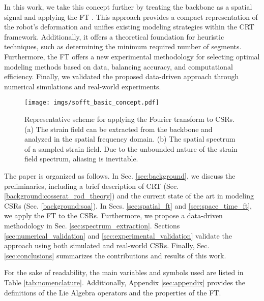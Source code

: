 In this work, we take this concept further by treating the backbone as a spatial signal and applying the \ac{FT} \cite{bracewell2007fourier}. This approach provides a compact representation of the robot's deformation and unifies existing modeling strategies within the \ac{CRT} framework. 
Additionally, it offers a theoretical foundation for heuristic techniques, such as determining the minimum required number of segments.
Furthermore, the \ac{FT} offers a new experimental methodology for selecting optimal modeling methods based on data, balancing accuracy, and computational efficiency.
Finally, we validated the proposed data-driven approach through numerical simulations and real-world experiments.
%     
\begin{figure}
    \centering
    \texttt{[image: imgs/sofft\_basic\_concept.pdf]}
    \caption{Representative scheme for applying the Fourier transform to \acp{CSR}. (a) The strain field can be extracted from the backbone and analyzed in the spatial frequency domain. (b) The spatial spectrum of a sampled strain field. Due to the unbounded nature of the strain field spectrum, aliasing is inevitable.}
    \label{fig:concept}
\end{figure}


The paper is organized as follows. In Sec. \ref{sec:background}, we discuss the preliminaries, including a brief description of \ac{CRT} (Sec. \ref{background:cosserat_rod_theory}) and the current state of the art in modeling \acp{CSR} (Sec. \ref{background:soa}). In Secs. \ref{sec:spatial_ft} and \ref{sec:space_time_ft}, we apply the \ac{FT} to the \acp{CSR}. Furthermore, we propose a data-driven methodology in Sec. \ref{sec:spectrum_extraction}. Sections \ref{sec:numerical_validation} and \ref{sec:experimental_validation} validate the approach using both simulated and real-world \acp{CSR}. Finally, Sec. \ref{sec:conclusions} summarizes the contributions and results of this work.

For the sake of readability, the main variables and symbols used are listed in Table \ref{tab:nomenclature}. Additionally, Appendix \ref{sec:appendix} provides the definitions of the Lie Algebra operators and the properties of the \ac{FT}.